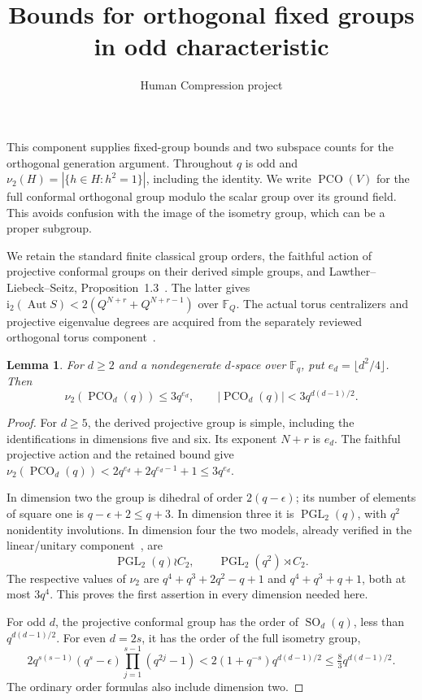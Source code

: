 \documentclass[11pt,a4paper]{article}
\title{Bounds for orthogonal fixed groups in odd characteristic}
\author{Human Compression project}\date{}
\newtheorem{lemma}{Lemma}\newtheorem{proposition}[lemma]{Proposition}
\newcommand{\F}{\mathbb F}\newcommand{\nuu}{\nu_2}
\newcommand{\PCO}{\operatorname{PCO}}
\begin{document}
\maketitle
This component supplies fixed-group bounds and two subspace counts for the orthogonal generation argument. Throughout $q$ is odd and
$\nuu(H)=|\{h\in H:h^2=1\}|$, including the identity.
We write $\PCO(V)$ for the full conformal orthogonal group modulo
the scalar group over its ground field. This avoids confusion with
the image of the isometry group, which can be a proper subgroup.

We retain the standard finite classical group orders, the faithful action
of projective conformal groups on their derived simple groups, and
Lawther--Liebeck--Seitz, Proposition~1.3~\cite{LLS}. The latter gives
$\mathrm i_2(\operatorname{Aut}S)<2(Q^{N+r}+Q^{N+r-1})$ over $\F_Q$.
The actual torus centralizers and projective eigenvalue degrees are
acquired from the separately reviewed orthogonal torus component~\cite{tori}.

\begin{lemma}\label{small}
For $d\ge2$ and a nondegenerate $d$-space over $\F_q$, put
$e_d=\lfloor d^2/4\rfloor$. Then
\[
 \nuu(\PCO_d(q))\le3q^{e_d},\qquad
 |\PCO_d(q)|<3q^{d(d-1)/2}.
\]
\end{lemma}
\begin{proof}
For $d\ge5$, the derived projective group is simple, including the
identifications in dimensions five and six. Its exponent $N+r$ is $e_d$.
The faithful projective action and the retained bound give
$\nuu(\PCO_d(q))<2q^{e_d}+2q^{e_d-1}+1\le3q^{e_d}$.

In dimension two the group is dihedral of order $2(q-\epsilon)$;
its number of elements of square one is $q-\epsilon+2\le q+3$.
In dimension three it is $\operatorname{PGL}_2(q)$, with $q^2$
nonidentity involutions. In dimension four the two models, already
verified in the linear/unitary component~\cite{linear}, are
\[
 \operatorname{PGL}_2(q)\wr C_2,\qquad
 \operatorname{PGL}_2(q^2)\rtimes C_2.
\]
The respective values of $\nuu$ are
$q^4+q^3+2q^2-q+1$ and $q^4+q^3+q+1$, both at most $3q^4$.
This proves the first assertion in every dimension needed here.

For odd $d$, the projective conformal group has the order of
$\operatorname{SO}_d(q)$, less than $q^{d(d-1)/2}$.
For even $d=2s$, it has the order of the full isometry group,
\[
 2q^{s(s-1)}(q^s-\epsilon)\prod_{j=1}^{s-1}(q^{2j}-1)
 <2(1+q^{-s})q^{d(d-1)/2}\le\tfrac83 q^{d(d-1)/2}.
\]
The ordinary order formulas also include dimension two.
\end{proof}
\end{document}
